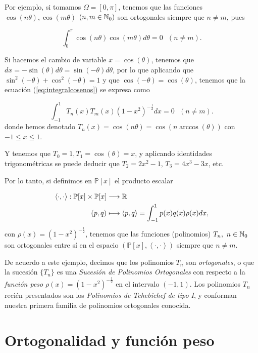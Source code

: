 Por ejemplo, si tomamos $\Omega = [0,\pi]$, tenemos que las funciones $\cos(n\theta), \cos(m\theta)$  $(n,m\in\mathbb{N}_0)$ son ortogonales siempre que $n\not= m$, pues 

\begin{equation}
    \label{eq:integralcosenos}
    \int_0^\pi \cos(n\theta)\cos(m\theta) d\theta = 0 \ \ \ (n\not=m).
\end{equation}


Si hacemos el cambio de variable $x = \cos(\theta)$, tenemos que $dx = -\sin(\theta)d\theta=\sin(-\theta)d\theta$, por lo que aplicando que $\sin^2(-\theta)+\cos^2(-\theta)=1$ y que $\cos(-\theta)=\cos(\theta)$, tenemos que la ecuación (\ref{eq:integralcosenos}) se expresa como


\begin{equation}
    \label{eq:integralTn}
    \int_{-1}^1 T_n(x)T_m(x) (1-x^2)^{-\frac 1 2}dx = 0  \ \ \ (n\not=m).
\end{equation}
donde hemos denotado $T_n (x) = \cos(n\theta) = \cos(n\arccos(\theta))$ con $-1\leq x \leq 1$. 

Y tenemos que $T_0=1, T_1=\cos(\theta)=x$, y aplicando identidades trigonométricas se puede deducir que $T_2=2x^2 - 1$, $T_3=4x^3 - 3x$, etc.

Por lo tanto, si definimos en $\mathbb{P}[x]$ el producto escalar

\begin{equation*}
    \begin{split}
        \left\langle\cdot,\cdot\right\rangle:\mathbb{P}[x]\times \mathbb{P}[x] &\longrightarrow \mathbb{R} \\
        (p,q)&\longmapsto \left\langle p,q \right\rangle=\int_{-1}^1 p(x)q(x)\rho(x)dx,
    \end{split}
\end{equation*}
con $\rho(x)=(1-x^2)^{-\frac 1 2}$, tenemos que las funciones (polinomios) $T_n,\ n\in\N_0$ son ortogonales entre sí en el espacio $(\mathbb{P}[x], \left\langle\cdot,\cdot\right\rangle)$ siempre que $n\not=m$.

De acuerdo a este ejemplo, decimos que los polinomios $T_n$ son \textit{ortogonales}, o que la sucesión $\{T_n\}$ es una \textit{Sucesión de Polinomios Ortogonales} con respecto a la \textit{función peso} $\rho(x)=(1-x^2)^{-\frac 1 2}$ en el intervalo $(-1,1)$. Los polinomios $T_n$ recién presentados son los \textit{Polinomios de Tchebichef de tipo I}, y conforman nuestra primera familia de polinomios ortogonales conocida.

\section{Ortogonalidad y función peso}
\label{c1section:ort-peso}

